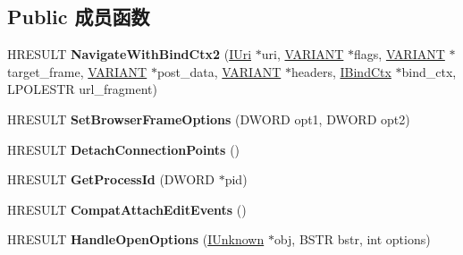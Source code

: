 \subsection*{Public 成员函数}
\begin{DoxyCompactItemize}
\item 
\mbox{\label{interface_i_web_browser_priv2_i_e8_a26525ee86cb73dcf4d343ddce0dc23f9}} 
H\+R\+E\+S\+U\+LT {\bfseries Navigate\+With\+Bind\+Ctx2} (\hyperlink{interface_i_uri}{I\+Uri} $\ast$uri, \hyperlink{structtag_v_a_r_i_a_n_t}{V\+A\+R\+I\+A\+NT} $\ast$flags, \hyperlink{structtag_v_a_r_i_a_n_t}{V\+A\+R\+I\+A\+NT} $\ast$target\+\_\+frame, \hyperlink{structtag_v_a_r_i_a_n_t}{V\+A\+R\+I\+A\+NT} $\ast$post\+\_\+data, \hyperlink{structtag_v_a_r_i_a_n_t}{V\+A\+R\+I\+A\+NT} $\ast$headers, \hyperlink{interface_i_bind_ctx}{I\+Bind\+Ctx} $\ast$bind\+\_\+ctx, L\+P\+O\+L\+E\+S\+TR url\+\_\+fragment)
\item 
\mbox{\label{interface_i_web_browser_priv2_i_e8_a6f9bb84d51158dee4b4bd86cc754c54c}} 
H\+R\+E\+S\+U\+LT {\bfseries Set\+Browser\+Frame\+Options} (D\+W\+O\+RD opt1, D\+W\+O\+RD opt2)
\item 
\mbox{\label{interface_i_web_browser_priv2_i_e8_a9e8c501c09e0e39930421bcf69e167bf}} 
H\+R\+E\+S\+U\+LT {\bfseries Detach\+Connection\+Points} ()
\item 
\mbox{\label{interface_i_web_browser_priv2_i_e8_afd0fcf045d44104eef933decfc67b2bc}} 
H\+R\+E\+S\+U\+LT {\bfseries Get\+Process\+Id} (D\+W\+O\+RD $\ast$pid)
\item 
\mbox{\label{interface_i_web_browser_priv2_i_e8_adcc591ddcc4917ad11f9546d6acbc43e}} 
H\+R\+E\+S\+U\+LT {\bfseries Compat\+Attach\+Edit\+Events} ()
\item 
\mbox{\label{interface_i_web_browser_priv2_i_e8_a51c55a1e2ae829366c2fa5fcc064cbb9}} 
H\+R\+E\+S\+U\+LT {\bfseries Handle\+Open\+Options} (\hyperlink{interface_i_unknown}{I\+Unknown} $\ast$obj, B\+S\+TR bstr, int options)
\item 
\mbox{\label{interface_i_web_browser_priv2_i_e8_aca3c546faae9a1ff6a936e7d2104ce6a}} 

\end{DoxyCompactItemize}

